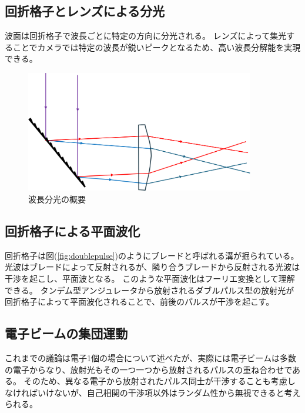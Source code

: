\documentclass[a4paper,11pt,uplatex]{jsbook}
\begin{document}
\subsection{回折格子とレンズによる分光}\label{sec:grating}
波面は回折格子で波長ごとに特定の方向に分光される。
レンズによって集光することでカメラでは特定の波長が鋭いピークとなるため、高い波長分解能を実現できる。
\begin{figure}[b]
  \centering
  \includegraphics[width=10cm]{image/2-dispersion.png}
  \caption{波長分光の概要}
\end{figure}
\subsection{回折格子による平面波化}\label{sec:grating2}
回折格子は図(\ref{fig:doublepulse})のようにブレードと呼ばれる溝が掘られている。
光波はブレードによって反射されるが、隣り合うブレードから反射される光波は干渉を起こし、平面波となる。
このような平面波化はフーリエ変換として理解できる。
タンデム型アンジュレータから放射されるダブルパルス型の放射光が回折格子によって平面波化されることで、前後のパルスが干渉を起こす。
\subsection{電子ビームの集団運動}
これまでの議論は電子1個の場合について述べたが、実際には電子ビームは多数の電子からなり、放射光もその一つ一つから放射されるパルスの重ね合わせである。
そのため、異なる電子から放射されたパルス同士が干渉することも考慮しなければいけないが、自己相関の干渉項以外はランダム性から無視できると考えられる。
\end{document}
